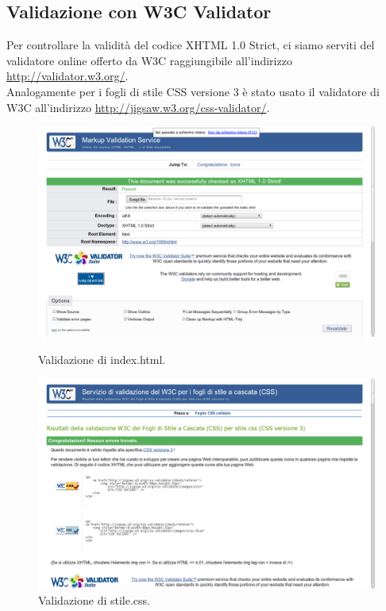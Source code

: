 \documentclass[a4paper]{article}
\begin{document}
\subsection{Validazione con W3C Validator}
Per controllare la validità del codice XHTML 1.0 Strict, ci siamo serviti del validatore online offerto da W3C raggiungibile all'indirizzo \url{http://validator.w3.org/}.\\
Analogamente per i fogli di stile CSS versione 3 è stato usato il validatore di W3C all'indirizzo \url{http://jigsaw.w3.org/css-validator/}.

\begin{figure}[!h]
\centering
\includegraphics[width=1.1\textwidth]{test/validazione/indexValidator.png}
\caption{\label{f_etichetta}Validazione di index.html.}
\includegraphics[width=1.1\textwidth]{test/validazione/stileValidator.png}
\caption{\label{f_etichetta}Validazione di stile.css.}
\end{figure}
\end{document}
